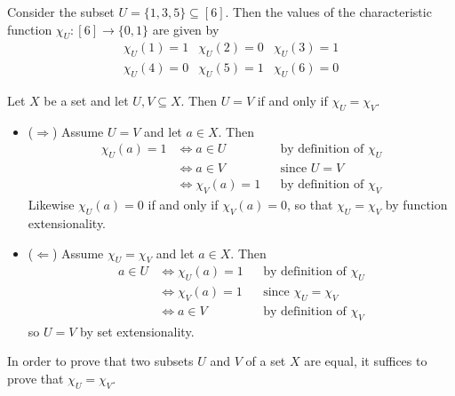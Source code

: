\begin{example}
Consider the subset $U = \{ 1,3,5 \} \subseteq [6]$. Then the values of the characteristic function $\chi_U : [6] \to \{0,1\}$ are given by
\[ \begin{matrix} \chi_U(1) = 1 & \chi_U(2) = 0 & \chi_U(3) = 1 \\ \chi_U(4) = 0 & \chi_U(5) = 1 & \chi_U(6) = 0 \end{matrix} \]
\end{example}

\begin{theorem}
\label{thmCharacteristicFunctionsCharacteriseSubsets}
Let $X$ be a set and let $U, V \subseteq X$. Then $U=V$ if and only if $\chi_U = \chi_V$.
\end{theorem}

\begin{cproof}
\fixlistskip
\begin{itemize}
\item ($\Rightarrow$)
Assume $U=V$ and let $a \in X$. Then
\begin{align*}
\chi_U(a) = 1 & \Leftrightarrow a \in U && \text{by definition of $\chi_U$} \\
&\Leftrightarrow a \in V && \text{since $U=V$} \\
&\Leftrightarrow \chi_V(a) = 1 && \text{by definition of $\chi_V$}
\end{align*}
Likewise $\chi_U(a) = 0$ if and only if $\chi_V(a) = 0$, so that $\chi_U = \chi_V$ by function extensionality.

\item ($\Leftarrow$) Assume $\chi_U = \chi_V$ and let $a \in X$. Then
\begin{align*}
a \in U & \Leftrightarrow \chi_U(a) = 1 && \text{by definition of $\chi_U$} \\
&\Leftrightarrow \chi_V(a) = 1 && \text{since $\chi_U = \chi_V$} \\
&\Leftrightarrow a \in V && \text{by definition of $\chi_V$}
\end{align*}
so $U=V$ by set extensionality.
\end{itemize}
\end{cproof}

\begin{strategy}
\label{strSetIdentitiesFromCharacteristicFunctions}
In order to prove that two subsets $U$ and $V$ of a set $X$ are equal, it suffices to prove that $\chi_U = \chi_V$.
\end{strategy}

